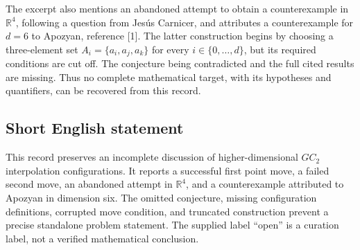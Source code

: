 \documentclass[11pt]{article}
\newcommand{\R}{\mathbb{R}}
\begin{document}
The excerpt also mentions an abandoned attempt to obtain a counterexample in \(\R^4\), following a question from Jes\'us Carnicer, and attributes a counterexample for \(d=6\) to Apozyan, reference [1]. The latter construction begins by choosing a three-element set \(A_i=\{a_i,a_j,a_k\}\) for every \(i\in\{0,\ldots,d\}\), but its required conditions are cut off. The conjecture being contradicted and the full cited results are missing. Thus no complete mathematical target, with its hypotheses and quantifiers, can be recovered from this record.
\subsection{Short English statement}
This record preserves an incomplete discussion of higher-dimensional \(GC_2\) interpolation configurations. It reports a successful first point move, a failed second move, an abandoned attempt in \(\R^4\), and a counterexample attributed to Apozyan in dimension six. The omitted conjecture, missing configuration definitions, corrupted move condition, and truncated construction prevent a precise standalone problem statement. The supplied label ``open'' is a curation label, not a verified mathematical conclusion.
\end{document}
